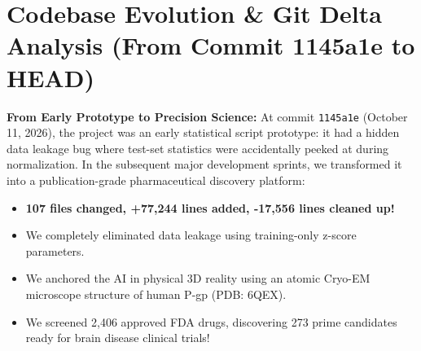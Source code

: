 \documentclass[11pt,a4paper]{article}
\begin{document}
\newpage
\section{Codebase Evolution \& Git Delta Analysis (From Commit 1145a1e to HEAD)}

\begin{laymanbox}
\textbf{From Early Prototype to Precision Science:}
At commit \texttt{1145a1e} (October 11, 2026), the project was an early statistical script prototype: it had a hidden data leakage bug where test-set statistics were accidentally peeked at during normalization. 
In the subsequent major development sprints, we transformed it into a publication-grade pharmaceutical discovery platform:
\begin{itemize}[leftmargin=*]
    \item \textbf{107 files changed, +77,244 lines added, -17,556 lines cleaned up!}
    \item We completely eliminated data leakage using training-only z-score parameters.
    \item We anchored the AI in physical 3D reality using an atomic Cryo-EM microscope structure of human P-gp (PDB: 6QEX).
    \item We screened 2,406 approved FDA drugs, discovering 273 prime candidates ready for brain disease clinical trials!
\end{itemize}
\end{laymanbox}
\end{document}
